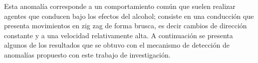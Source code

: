 Esta anomal\'{i}a corresponde a un comportamiento com\'{u}n que suelen realizar agentes que conducen bajo los efectos del alcohol; consiste en una conducci\'{o}n que presenta movimientos en zig zag de forma brusca, es decir cambios de direcci\'{o}n constante y a una velocidad relativamente alta. A continuaci\'{o}n se presenta algunos de los resultados que se obtuvo con el mecanismo de detecci\'{o}n de anomal\'{i}as propuesto con este trabajo de investigaci\'{o}n.


\begin{figure}[H]
        \centering
        
\end{figure}
